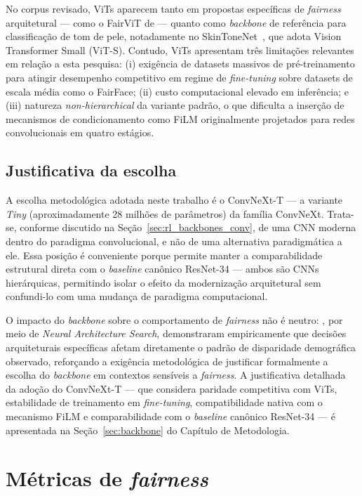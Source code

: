 No corpus revisado, ViTs aparecem tanto em propostas específicas de \emph{fairness} arquitetural --- como o FairViT de  --- quanto como \emph{backbone} de referência para classificação de tom de pele, notadamente no SkinToneNet~\cite{matias2026large}, que adota Vision Transformer Small (ViT-S). Contudo, ViTs apresentam três limitações relevantes em relação a esta pesquisa: (i) exigência de datasets massivos de pré-treinamento para atingir desempenho competitivo em regime de \emph{fine-tuning} sobre datasets de escala média como o FairFace; (ii) custo computacional elevado em inferência; e (iii) natureza \emph{non-hierarchical} da variante padrão, o que dificulta a inserção de mecanismos de condicionamento como FiLM originalmente projetados para redes convolucionais em quatro estágios.

\subsection{Justificativa da escolha}
\label{sec:rl_backbones_escolha}

A escolha metodológica adotada neste trabalho é o ConvNeXt-T --- a variante \emph{Tiny} (aproximadamente 28 milhões de parâmetros) da família ConvNeXt. Trata-se, conforme discutido na Seção~\ref{sec:rl_backbones_conv}, de uma CNN moderna dentro do paradigma convolucional, e não de uma alternativa paradigmática a ele. Essa posição é conveniente porque permite manter a comparabilidade estrutural direta com o \emph{baseline} canônico ResNet-34 --- ambos são CNNs hierárquicas, permitindo isolar o efeito da modernização arquitetural sem confundi-lo com uma mudança de paradigma computacional.

O impacto do \emph{backbone} sobre o comportamento de \emph{fairness} não é neutro: , por meio de \emph{Neural Architecture Search}, demonstraram empiricamente que decisões arquiteturais específicas afetam diretamente o padrão de disparidade demográfica observado, reforçando a exigência metodológica de justificar formalmente a escolha do \emph{backbone} em contextos sensíveis a \emph{fairness}. A justificativa detalhada da adoção do ConvNeXt-T --- que considera paridade competitiva com ViTs, estabilidade de treinamento em \emph{fine-tuning}, compatibilidade nativa com o mecanismo FiLM e comparabilidade com o \emph{baseline} canônico ResNet-34 --- é apresentada na Seção~\ref{sec:backbone} do Capítulo de Metodologia.


\section{Métricas de \emph{fairness}}
\label{sec:rl_metricas}

